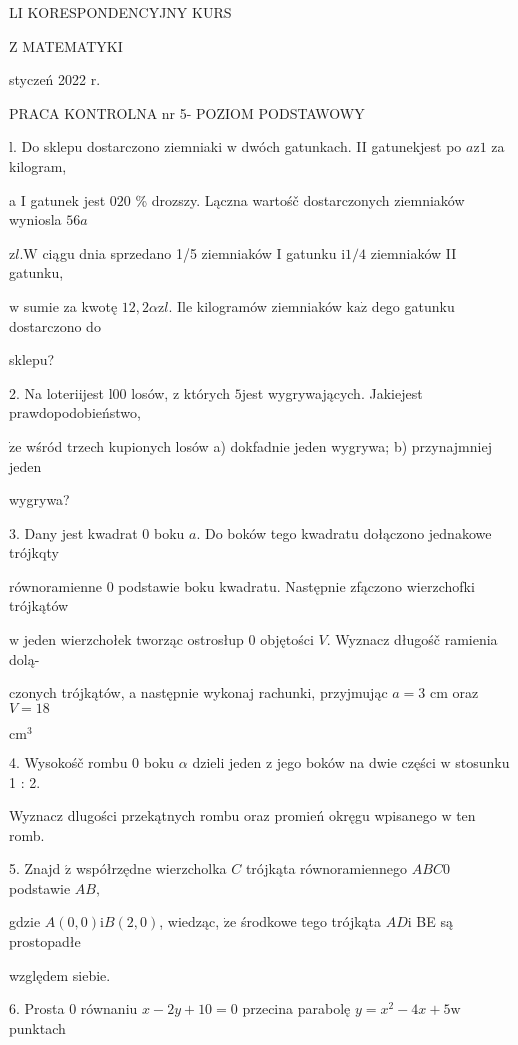 \documentclass[a4paper,12pt]{article}
\begin{document}
LI KORESPONDENCYJNY KURS

Z MATEMATYKI

styczeń 2022 r.

PRACA KONTROLNA nr 5- POZIOM PODSTAWOWY

l. Do sklepu dostarczono ziemniaki $\mathrm{w}$ dwóch gatunkach. II gatunekjest po $a\mathrm{z}1$ za kilogram,

a I gatunek jest $020$ \% drozszy. Lączna wartośč dostarczonych ziemniaków wyniosla $56a$

$\mathrm{z}l. \mathrm{W}$ ciągu dnia sprzedano 1/5 ziemniaków I gatunku $\mathrm{i} 1/4$ ziemniaków II gatunku,

$\mathrm{w}$ sumie za kwotę $12,2\alpha \mathrm{z}l$. Ile kilogramów ziemniaków $\mathrm{k}\mathrm{a}\dot{\mathrm{z}}$ dego gatunku dostarczono do

sklepu?

2. Na loteriijest l00 losów, $\mathrm{z}$ których $5$jest wygrywających. Jakiejest prawdopodobieństwo,

$\dot{\mathrm{z}}\mathrm{e}$ wśród trzech kupionych losów a) dokfadnie jeden wygrywa; b) przynajmniej jeden

wygrywa?

3. Dany jest kwadrat $0$ boku $a$. Do boków tego kwadratu dołączono jednakowe trójkqty

równoramienne $0$ podstawie boku kwadratu. Następnie zfączono wierzchofki trójkątów

$\mathrm{w}$ jeden wierzchołek tworząc ostrosłup $0$ objętości $V$. Wyznacz długośč ramienia dolą-

czonych trójkątów, a następnie wykonaj rachunki, przyjmując $a=3$ cm oraz $V= 18$

$\mathrm{c}\mathrm{m}^{3}$

4. Wysokośč rombu $0$ boku $\alpha$ dzieli jeden $\mathrm{z}$ jego boków na dwie części $\mathrm{w}$ stosunku 1 : 2.

Wyznacz dlugości przekątnych rombu oraz promień okręgu wpisanego $\mathrm{w}$ ten romb.

5. Znajd $\acute{\mathrm{z}}$ współrzędne wierzcholka $C$ trójkąta równoramiennego $ABC0$ podstawie $AB,$

gdzie $A(0,0) \mathrm{i} B(2,0)$, wiedząc, $\dot{\mathrm{z}}\mathrm{e}$ środkowe tego trójkąta $AD \mathrm{i}$ BE są prostopadłe

względem siebie.

6. Prosta $0$ równaniu $x-2y+10 = 0$ przecina parabolę $y = x^{2}-4x+5\mathrm{w}$ punktach
\end{document}
